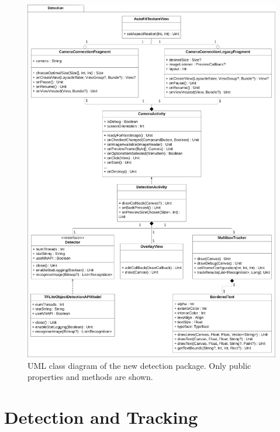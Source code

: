 \documentclass[
			   fontsize=11pt,
               paper=a4,
               bibliography=totoc,
               idxtotoc,
               headsepline,
               footsepline,
               footinclude=false,
               BCOR=12mm,
               DIV=13,
               openany,   %
               ]
               {scrbook}
\begin{document}
\begin{figure}[h]
	\centering
	\includegraphics[width=\textwidth]{figures/uml_detection_package.png}
	\caption[UML Class Diagram of The New Detection Package]{UML class diagram of the new detection package. Only public properties and methods are shown.}
	\label{fig:umlDetectionPackage} %
\end{figure}


\section{Detection and Tracking}
\end{document}
